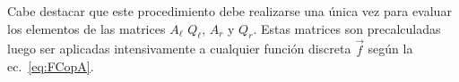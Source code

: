 Cabe destacar que este procedimiento debe realizarse una única vez 
para evaluar los elementos de las matrices $A_{\ell}$ $Q_{\ell}$, $A_{r}$ y $Q_{r}$. 
Estas matrices son precalculadas luego ser aplicadas intensivamente a cualquier 
función discreta $\vec{f}$ según la ec.~\eqref{eq:FCopA}.


